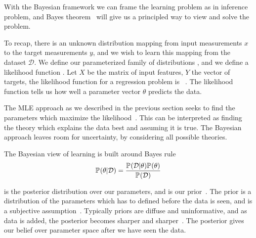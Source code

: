 \label{sub:bayesian_framework}

With the Bayesian framework we can frame the learning problem as in inference problem, and Bayes theorem~\citep[chapter~2]{mackay2003information} will give us a principled way to view and solve the problem.

To recap, there is an unknown distribution  mapping from input measurements $x$ to the target measurements $y$, and we wish to learn this mapping from the dataset $\mathcal{D}$. We define our parameterized family of distributions , and we define a likelihood function . Let $X$ be the matrix of input features, $Y$ the vector of targets, the likelihood function for a regression problem is ~\citep{goodfellow2016deep}. The likelihood function tells us how well a parameter vector $\theta$ predicts the data. 

The MLE approach as we described in the previous section seeks to find the parameters which maximize the likelihood~\cite[chapter~22]{mackay2003information}. This can be interpreted as finding the theory which explains the data best and assuming it is true. The Bayesian approach leaves room for uncertainty, by considering all possible theories. 



The Bayesian view of learning is built around Bayes rule~\citep[chapter~2]{mackay2003information}
\begin{equation}
    \label{eq:bayes_rule}
    \mathbb{P}_{}(\theta| \mathcal{D}) = \frac{\mathbb{P}_{}(\mathcal{D}|\theta) \mathbb{P}_{}(\theta)}{\mathbb{P}_{}(\mathcal{D})}
\end{equation}

 is the posterior distribution over our parameters, and \pdf{\theta} is our prior~\citep{mackay2003information}. The prior is a distribution of the parameters which has to defined before the data is seen, and is a subjective assumption~\citep{mackay2003information}. Typically priors are diffuse and uninformative, and as data is added, the posterior becomes sharper and sharper~\cite[chapter~5]{goodfellow2016deep}. The posterior gives our belief over parameter space after we have seen the data. 

